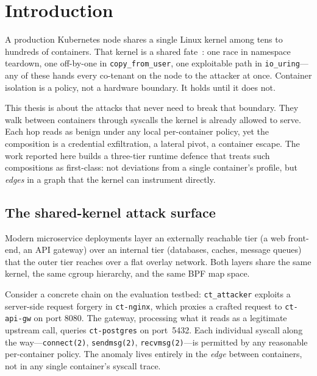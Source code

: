 \chapter{Introduction}
\label{Chapter1}

A production Kubernetes node shares a single Linux kernel among tens to
hundreds of containers. That kernel is a shared fate~\cite{gregg2019bpf}: one
race in namespace teardown, one off-by-one in \texttt{copy\_from\_user}, one
exploitable path in \texttt{io\_uring}---any of these hands every co-tenant on
the node to the attacker at once. Container isolation is a policy, not a
hardware boundary. It holds until it does not.

This thesis is about the attacks that never need to break that boundary. They
walk between containers through syscalls the kernel is already allowed to
serve. Each hop reads as benign under any local per-container policy, yet the
composition is a credential exfiltration, a lateral pivot, a container
escape. The work reported here builds a three-tier runtime defence that
treats such compositions as first-class: not deviations from a single
container's profile, but \emph{edges} in a graph that the kernel can
instrument directly.

\section{The shared-kernel attack surface}
\label{sec:attack-surface}

Modern microservice deployments layer an externally reachable tier (a web
front-end, an API gateway) over an internal tier (databases, caches, message
queues) that the outer tier reaches over a flat overlay network. Both layers
share the same kernel, the same cgroup hierarchy, and the same BPF map space.

Consider a concrete chain on the evaluation testbed: \texttt{ct\_attacker}
exploits a server-side request forgery in \texttt{ct-nginx}, which proxies a
crafted request to \texttt{ct-api-gw} on port 8080. The gateway, processing
what it reads as a legitimate upstream call, queries \texttt{ct-postgres} on
port~5432. Each individual syscall along the way---\texttt{connect(2)},
\texttt{sendmsg(2)}, \texttt{recvmsg(2)}---is permitted by any reasonable
per-container policy. The anomaly lives entirely in the \emph{edge} between
containers, not in any single container's syscall trace.

